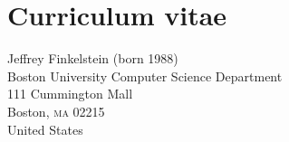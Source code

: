 \chapter{Curriculum vitae}
Jeffrey Finkelstein (born 1988)\\[5ex]
%
Boston University Computer Science Department\\
111 Cummington Mall\\
Boston, \textsc{ma} 02215\\
United States
